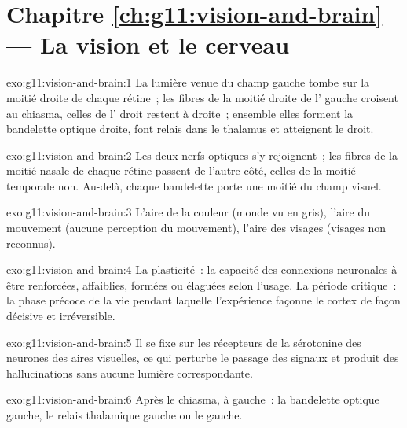 \section*{Chapitre \ref{ch:g11:vision-and-brain} --- La vision et le cerveau}

\begin{solution}{exo:g11:vision-and-brain:1}
La lumière venue du champ gauche tombe sur la moitié droite de chaque
rétine~; les fibres de la moitié droite de l' gauche croisent au
chiasma, celles de l' droit restent à droite~; ensemble elles
forment la bandelette optique droite, font relais dans le thalamus et
atteignent le  droit.
\end{solution}

\begin{solution}{exo:g11:vision-and-brain:2}
Les deux nerfs optiques s'y rejoignent~; les fibres de la moitié nasale
de chaque rétine passent de l'autre côté, celles de la moitié temporale
non. Au-delà, chaque bandelette porte une moitié du champ visuel.
\end{solution}

\begin{solution}{exo:g11:vision-and-brain:3}
L'aire de la couleur (monde vu en gris), l'aire du mouvement (aucune
perception du mouvement), l'aire des visages (visages non reconnus).
\end{solution}

\begin{solution}{exo:g11:vision-and-brain:4}
La plasticité~: la capacité des connexions neuronales à être
renforcées, affaiblies, formées ou élaguées selon l'usage. La période
critique~: la phase précoce de la vie pendant laquelle l'expérience
façonne le cortex de façon décisive et irréversible.
\end{solution}

\begin{solution}{exo:g11:vision-and-brain:5}
Il se fixe sur les récepteurs de la sérotonine des neurones des aires
visuelles, ce qui perturbe le passage des signaux et produit des
hallucinations sans aucune lumière correspondante.
\end{solution}

\begin{solution}{exo:g11:vision-and-brain:6}
Après le chiasma, à gauche~: la bandelette optique gauche, le relais
thalamique gauche ou le  gauche.
\end{solution}

